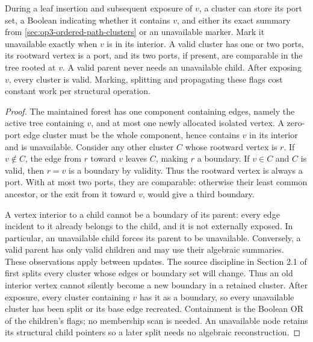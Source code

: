 \begin{lemma}
\label{lem:op3-source-interior-adapter}
During a leaf insertion and subsequent exposure of $v$, a cluster can store
its port set, a Boolean indicating whether it contains $v$, and either its
exact summary from \cref{sec:op3-ordered-path-clusters} or an unavailable
marker. Mark it unavailable exactly when $v$ is in its interior.
A valid cluster has one or two ports, its rootward vertex is a port, and its
two ports, if present, are comparable in the tree rooted at $v$.
A valid parent never needs an unavailable child. After exposing $v$, every
cluster is valid. Marking, splitting and propagating these flags cost
constant work per structural operation.
\end{lemma}
\begin{proof}
The maintained forest has one component containing edges, namely the active
tree containing $v$, and at most one newly allocated isolated vertex.
A zero-port edge cluster must be the whole component, hence contains $v$
in its interior and is unavailable. Consider any other cluster $C$ whose
rootward vertex is $r$. If $v\notin C$, the edge from $r$ toward $v$ leaves
$C$, making $r$ a boundary. If $v\in C$ and $C$ is valid, then $r=v$ is a
boundary by validity. Thus the rootward vertex is always a port. With at
most two ports, they are comparable: otherwise their least common ancestor,
or the exit from it toward $v$, would give a third boundary.

A vertex interior to a child cannot be a boundary of its parent: every edge
incident to it already belongs to the child, and it is not externally
exposed. In particular, an unavailable child forces its parent to be
unavailable. Conversely, a valid parent has only valid children and may use
their algebraic summaries. These observations apply between updates.
The source discipline in Section 2.1 of \cite{alstrup2005toptrees} first
splits every cluster whose edges or boundary set will change. Thus an old
interior vertex cannot silently become a new boundary in a retained cluster.
After exposure, every cluster containing $v$ has it as a boundary, so every
unavailable cluster has been split or its base edge recreated.
Containment is the Boolean OR of the children's flags; no membership scan
is needed. An unavailable node retains its structural child pointers so a
later split needs no algebraic reconstruction.
\end{proof}

